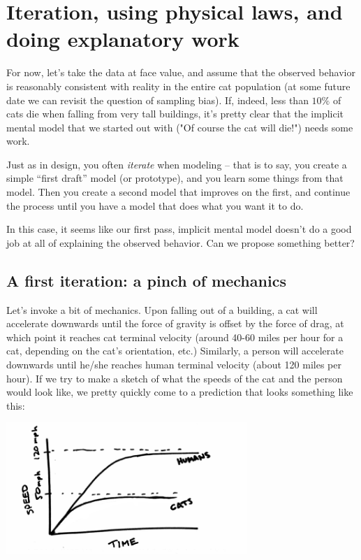 \section{Iteration, using physical laws, and doing explanatory work}

For now, let's take the data at face value, and assume that the observed behavior is reasonably consistent with reality in the entire cat population (at some future date we can revisit the question of sampling bias).  If, indeed, less than $10\%$ of cats die when falling from very tall buildings, it's pretty clear that the implicit mental model that we started out with ("Of course the cat will die!") needs some work.

Just as in design, you often {\it iterate} when modeling -- that is to say, you create a simple ``first draft'' model (or prototype), and you learn some things from that model.  Then you create a second model that improves on the first, and continue the process until you have a model that does what you want it to do.

In this case, it seems like our first pass, implicit mental model doesn't do a good job at all of explaining the observed behavior.  Can we propose something better?

\subsection{A first iteration: a pinch of mechanics}

Let's invoke a bit of mechanics.  Upon falling out of a building, a cat will accelerate downwards until the force of gravity is offset by the force of drag, at which point it reaches cat terminal velocity (around 40-60 miles per hour for a cat, depending on the cat's orientation, etc.)  Similarly, a person will accelerate downwards until he/she reaches human terminal velocity (about 120 miles per hour).  If we try to make a sketch of what the speeds of the cat and the person would look like, we pretty quickly come to a prediction that looks something like this:

\centerline{\includegraphics[height=5cm]{figs/TerminalVelocitySketch}}

